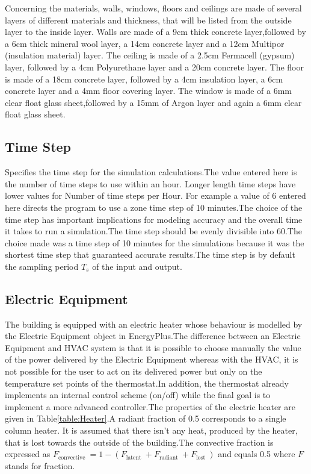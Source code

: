 \documentclass[a4paper,12pt]{article}
\numberwithin{equation}{section}
\begin{document}
\noindent
Concerning the materials, walls, windows, floors and ceilings are made of several layers of different materials and thickness, that will be listed from the outside layer to the inside layer. Walls are made of a 9cm thick concrete layer,followed by a 6cm thick mineral wool layer, a 14cm concrete layer and a 12cm Multipor (insulation material) layer. The ceiling is made of a 2.5cm Fermacell (gypsum) layer, followed by a 4cm Polyurethane layer and a 20cm concrete layer.
The floor is made of a 18cm concrete layer, followed by a 4cm insulation layer, a 6cm concrete layer and a 4mm floor covering layer. The window is made of a 6mm clear float glass sheet,followed by a 15mm of Argon layer and again a 6mm clear float glass sheet.

\subsection{Time Step }
Specifies the  time step for the simulation calculations.The value entered here is the number of time steps to use within an hour. Longer length time steps have lower values for Number of time steps per Hour. For example a value of 6 entered here directs the program to use a zone time step of 10 minutes.The choice of the time step has important implications for modeling accuracy and the overall time it takes to run a simulation.The time step should be evenly divisible into 60.The choice made was a time step of 10 minutes for the simulations because it was the shortest time step that guaranteed accurate results.The time step is by default the sampling period $T_{s}$ of the input and output.

\subsection{Electric Equipment}
The building is equipped with an electric heater whose behaviour is modelled by the Electric Equipment object in EnergyPlus.The difference between an Electric Equipment and HVAC system is that it is possible to choose manually the value of the power delivered by the Electric Equipment
whereas with the HVAC, it is not possible for the user to act on its delivered power but only on the temperature set points of the thermostat.In addition, the thermostat already implements an internal control scheme (on/off) while the final goal is to implement a more advanced controller.The properties of the electric heater are given in Table\ref{table:Heater}.A radiant fraction of 0.5 corresponds to a single column heater. It is assumed that there isn’t any heat, produced by the heater, that is lost towards the outside of the building.The convective fraction is expressed as $F_{\text {convective }}=1-\left(F_{\text {latent }}+F_{\text {radiant }}+F_{\text {lost }}\right)$ and equals 0.5 where $F$ stands for fraction.
\end{document}
